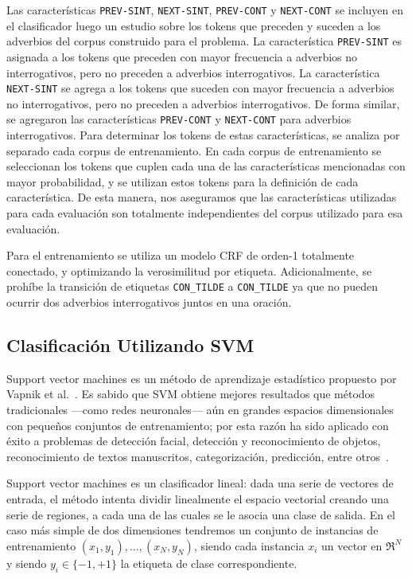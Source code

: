 \documentclass[runningheads,a4paper]{llncs}
\begin{document}
Las características \texttt{\small PREV-SINT}, \texttt{\small NEXT-SINT}, \texttt{\small PREV-CONT} y \texttt{\small NEXT-CONT} se incluyen en el clasificador luego un estudio sobre los tokens que preceden y suceden a los adverbios del corpus construido para el problema. La característica \texttt{\small PREV-SINT} es asignada a los tokens que preceden con mayor frecuencia a adverbios no interrogativos, pero no preceden a adverbios interrogativos. La característica \texttt{\small NEXT-SINT} se agrega a los tokens que suceden con mayor frecuencia a adverbios no interrogativos, pero no preceden a adverbios interrogativos. De forma similar, se agregaron las características \texttt{\small PREV-CONT} y \texttt{\small NEXT-CONT} para adverbios interrogativos. Para determinar los tokens de estas características, se analiza por separado cada corpus de entrenamiento. En cada corpus de entrenamiento se seleccionan los tokens que cuplen cada una de las características mencionadas con mayor probabilidad, y se utilizan estos tokens para la definición de cada característica. De esta manera, nos aseguramos que las características utilizadas para cada evaluación son totalmente independientes del corpus utilizado para esa evaluación.

Para el entrenamiento se utiliza un modelo CRF de orden-1 totalmente conectado, y optimizando la verosimilitud por etiqueta. Adicionalmente, se prohíbe la transición de etiquetas \texttt{\small CON\_TILDE} a \texttt{\small CON\_TILDE} ya que no pueden ocurrir dos adverbios interrogativos juntos en una oración. 

\subsection{Clasificación Utilizando SVM}
\label{sec:SVM}

Support vector machines es un método de aprendizaje estadístico propuesto por Vapnik et al.~\cite{CORTES95}. Es sabido que SVM obtiene mejores resultados que métodos tradicionales ---como redes neuronales--- aún en grandes espacios dimensionales con pequeños conjuntos de entrenamiento; por esta razón ha sido aplicado con éxito a problemas de detección facial, detección y reconocimiento de objetos, reconocimiento de textos manuscritos, categorización, predicción, entre otros~\cite{BYUN02}. 

Support vector machines es un clasificador lineal: dada una serie de vectores de entrada, el m\'etodo intenta dividir linealmente el espacio vectorial creando una serie de regiones, a cada una de las cuales se le asocia una clase de salida. En el caso más simple de dos dimensiones tendremos un conjunto de instancias de entrenamiento ${(x_1, y_1),...,(x_N,y_N)}$, siendo cada instancia $x_i$ un vector en $\Re^N$ y siendo $y_i \in \lbrace-1,+1\rbrace$ la etiqueta de clase correspondiente. 
\end{document}
